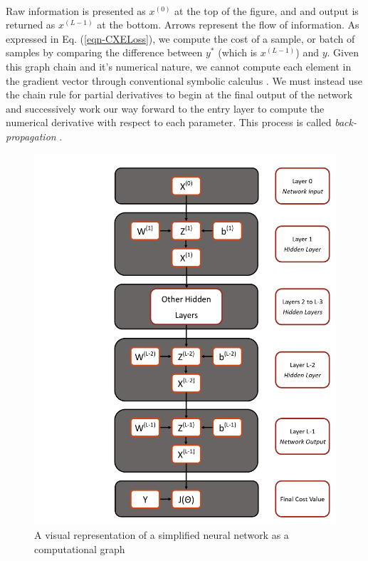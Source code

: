 \documentclass[12pt,letterpaper]{article}
\begin{document}
\paragraph*{}Raw information is presented as $x^{(0)}$ at the top of the figure, and and output is returned as $x^{(L-1)}$ at the bottom. Arrows represent the flow of information. As expressed in Eq. (\ref{eqn-CXELoss}), we compute the cost of a sample, or batch of samples by comparing the difference between $y^*$ (which is $x^{(L-1)}$) and $y$. Given this graph chain and it's numerical nature, we cannot compute each element in the gradient vector through conventional symbolic calculus \cite{Loy}. We must instead use the chain rule for partial derivatives to begin at the final output of the network and successively work our way forward to the entry layer to compute the numerical derivative with respect to each parameter. This process is called \textit{back-propagation} \cite{Geron,Goodfellow}.

\begin{figure}[H]
\begin{center}
\includegraphics[scale=0.8]{../Figures/LayerGraph}
\end{center}
\caption{A visual representation of a simplified neural network as a computational graph}
\label{fig-ComputationalGraph}
\end{figure}
\end{document}
